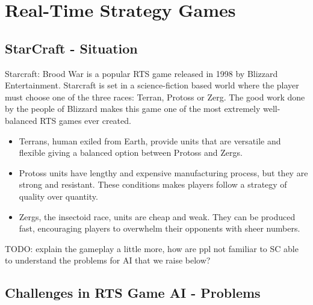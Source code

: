 \documentclass[journal]{IEEEtran}
\begin{document}
\section{Real-Time Strategy Games}\label{sec:rts}

\subsection{StarCraft {\color{blue}- Situation}}\label{subsec:starcraft}

Starcraft: Brood War is a popular RTS game released in 1998 by Blizzard Entertainment. Starcraft is set in a science-fiction based world where the player must choose one of the three races: Terran, Protoss or Zerg. The good work done by the people of Blizzard makes this game one of the most extremely well-balanced RTS games ever created.
\begin{itemize}
	\item Terrans, human exiled from Earth, provide units that are versatile and flexible giving a balanced option between Protoss and Zergs.
	\item Protoss units have lengthy and expensive manufacturing process, but they are strong and resistant. These conditions makes players follow a strategy of quality over quantity.
	\item Zergs, the insectoid race, units are cheap and weak. They can be produced fast, encouraging players to overwhelm their opponents with sheer numbers.
\end{itemize}

{\color{blue}TODO: explain the gameplay a little more, how are ppl not familiar to SC able to understand the problems for AI that we raise below?}

\subsection{Challenges in RTS Game AI {\color{blue}- Problems}}\label{subsec:challenges}
\end{document}
